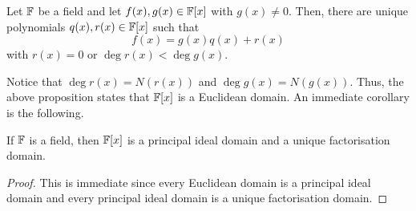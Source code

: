 \begin{prop}
    Let $\mathbb{F}$ be a field and let $f(x), g(x) \in \mathbb{F}[x]$ with $g(x) \neq 0$. Then, there are unique polynomials $q(x), r(x) \in \mathbb{F}[x]$ such that 
    \[
        f(x) = g(x)q(x) + r(x)
    \]
    with $r(x) = 0$ or $\deg r(x) < \deg g(x)$.
\end{prop}

Notice that $\deg r(x) = N(r(x))$ and $\deg g(x) = N(g(x))$. Thus, the above proposition states that $\mathbb{F}[x]$ is a Euclidean domain. An immediate corollary is the following.

\begin{cor} \label{cor:F[x]-is-UFD-and-PID}
    If $\mathbb{F}$ is a field, then $\mathbb{F}[x]$ is a principal ideal domain and a unique factorisation domain.
\end{cor}
\begin{proof}
    This is immediate since every Euclidean domain is a principal ideal domain and every principal ideal domain is a unique factorisation domain.
\end{proof}

